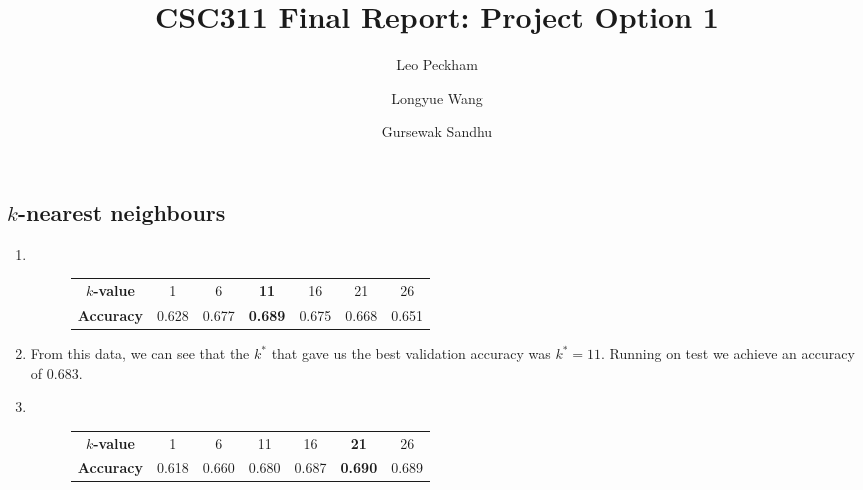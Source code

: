\documentclass[twocolumn]{article}
\title{CSC311 Final Report: Project Option 1}
\author[]{Leo Peckham}
\author[]{Longyue Wang}
\author[]{Gursewak Sandhu}
\affil[]{}
\date{}
\begin{document}
\maketitle

\section{}

\subsection{$k$-nearest neighbours}

\begin{enumerate}

\item
~
\begin{figure}[!h]
    \centering
    
    {\footnotesize
        \setlength{\tabcolsep}{3pt}
        \begin{tabular}{ |c|c|c|c|c|c|c| } 
            \hline
            \textbf{$k$-value} & 1 & 6 & {\bf 11} & 16 & 21 & 26 \\ 
            \textbf{Accuracy} & 0.628 & 0.677 & {\bf 0.689}
                              & 0.675 & 0.668 & 0.651 \\ 
            \hline
        \end{tabular}
    }
    \label{fig:userclustering}
\end{figure}


\item
From this data, we can see that the $k^*$ that gave us the best validation
accuracy was $k^* = 11$. Running on test we achieve an accuracy of $0.683$.

\item
~
\begin{figure}[H]
    \centering
    
    {\footnotesize
        \setlength{\tabcolsep}{3pt}
        \begin{tabular}{ |c|c|c|c|c|c|c| } 
            \hline
            \textbf{$k$-value} & 1 & 6 & 11 & 16 & {\bf 21} & 26 \\ 
            \textbf{Accuracy} & 0.618 & 0.660 & 0.680
                              & 0.687 & {\bf 0.690} & 0.689 \\ 
            \hline
        \end{tabular}
    }
    \label{fig:questionclustering}
\end{figure}


\end{enumerate}
\end{document}
